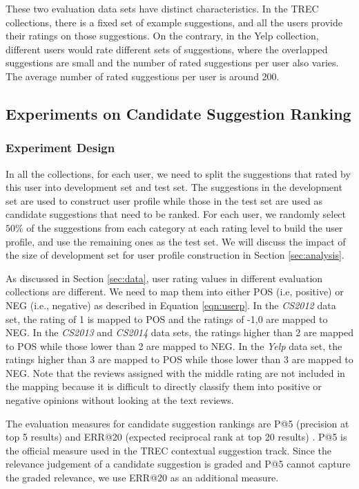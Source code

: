These two evaluation data sets have distinct characteristics. In the TREC collections, there is a fixed set of example suggestions, and all the users provide their ratings on those suggestions. On the contrary,
in the Yelp collection, different users would rate different
sets of suggestions, where the overlapped suggestions are small and the number of rated suggestions per user also varies. 
The average number of rated suggestions per user is around 200.

\subsection{Experiments on Candidate Suggestion Ranking}
\label{sec:exp_candi_rank}

\subsubsection{Experiment Design}
\label{sec:design}

In all the collections, for each user, we need to split
the suggestions that rated by this user into development set and test set. The suggestions in the development set are used to construct user profile while those in the test set are used as candidate suggestions that need to be ranked.
For each user, we randomly select $50\%$ of the suggestions from
each category at each rating level to build the user profile,
and use the remaining ones as the test set. We will discuss the impact of the size of development set for user profile construction in Section \ref{sec:analysis}.

As discussed in Section \ref{sec:data}, user rating
values in different evaluation collections are different.
We need to map them into either POS (i.e, positive) or
NEG (i.e., negative) as described in Equation \ref{eqn:userp}.
In the {\em CS2012} data set, the rating of 1 is mapped to POS
and the ratings of -1,0 are mapped to NEG.  In the {\em CS2013}
and {\em CS2014} data sets, the ratings higher than 2 are mapped to POS while those
lower than 2 are mapped to NEG.
In the {\em Yelp} data set, the ratings higher than 3
are mapped to POS while those lower than 3 are mapped to NEG.
Note that the reviews assigned with the middle rating 
are not included in the mapping because
it is difficult to directly classify them into positive or
negative opinions without looking at the text reviews.

The evaluation measures for candidate suggestion rankings
are P@5 (precision at top 5 results) and ERR@20
(expected reciprocal rank at top 20 results)
\cite{Chapelle:2009:ERR:1645953.1646033}.
P@5 is the official measure used in the TREC contextual
suggestion track. Since the relevance judgement of
a candidate suggestion is graded and P@5 cannot
capture the graded relevance, we use ERR@20 as an
additional measure.

